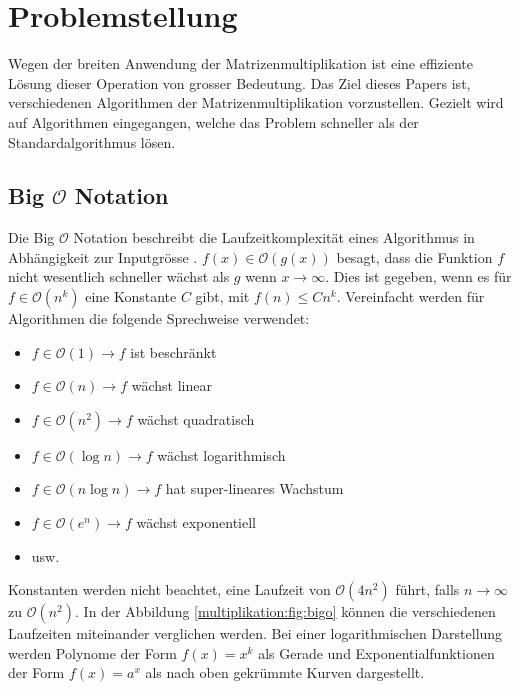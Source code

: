 %
%
%
\section{Problemstellung}
Wegen der breiten Anwendung der Matrizenmultiplikation ist eine effiziente L\"osung dieser Operation von grosser Bedeutung.
Das Ziel dieses Papers ist, verschiedenen Algorithmen der Matrizenmultiplikation vorzustellen.
Gezielt wird auf Algorithmen eingegangen, welche das Problem schneller als der Standardalgorithmus l\"osen.

\subsection{Big $\mathcal{O}$ Notation}
\label{muliplikation:sec:bigo}
Die Big $\mathcal{O}$ Notation beschreibt die Laufzeitkomplexit\"at eines Algorithmus in Abhängigkeit zur Inputgrösse \cite{multiplikation:bigo}.
$f(x) \in \mathcal{O}(g(x))$ besagt, dass die Funktion $f$ nicht wesentlich schneller w\"achst als $g$ wenn $x \rightarrow \infty$.
Dies ist gegeben, wenn es für $f \in \mathcal{O}(n^k)$ eine Konstante $C$ gibt, mit $f(n) \leq Cn^k$.
Vereinfacht werden f\"ur Algorithmen die folgende Sprechweise verwendet:
\begin{itemize}
	\item $f \in \mathcal{O}(1) \rightarrow f$ ist beschr\"ankt
	\item $f \in \mathcal{O}(n) \rightarrow f$ w\"achst linear
	\item $f \in \mathcal{O}  (n^2   ) \rightarrow f$ w\"achst quadratisch
	\item $f \in \mathcal{O}(\log n) \rightarrow f$ w\"achst logarithmisch
	\item $f \in \mathcal{O}(n \log n) \rightarrow f$ hat super-lineares Wachstum
	\item $f \in \mathcal{O}  (e^n   ) \rightarrow f$ w\"achst exponentiell
	\item usw.
\end{itemize}

Konstanten werden nicht beachtet, eine Laufzeit von  $\mathcal{O}(4n^2)$ führt, falls $n \rightarrow \infty$ zu $\mathcal{O}(n^2)$.
In der Abbildung \ref{multiplikation:fig:bigo} k\"onnen die verschiedenen Laufzeiten miteinander verglichen werden.
Bei einer logarithmischen Darstellung werden Polynome der Form $f(x) = x^k$ als Gerade und Exponentialfunktionen der Form $f(x) = a^x$ als nach oben gekr\"ummte Kurven dargestellt.




